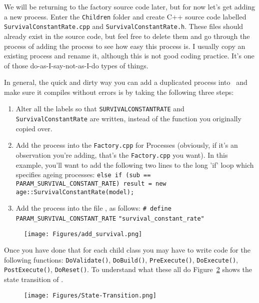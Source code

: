 We will be returning to the factory source code later, but for now let's get adding a new process. Enter the \texttt{Children} folder and create C++ source code labelled \texttt{SurvivalConstantRate.cpp} and \texttt{SurvivalConstantRate.h}. These files should already exist in the source code, but feel free to delete them and go through the process of adding the process to see how easy this process is. I usually copy an existing process and rename it, although this is not good coding practice. It's one of those do-as-I-say-not-as-I-do types of things.

In general, the quick and dirty way you can add a duplicated process into \CNAME\ and make sure it compiles without errors is by taking the following three steps:
\begin{enumerate}
	\item Alter all the labels so that \texttt{SURVIVALCONSTANTRATE} and \texttt{SurvivalConstantRate} are written, instead of the function you originally copied over.
	\item Add the process into the \texttt{Factory.cpp} for Processes (obviously, if it's an observation you're adding, that's the \texttt{Factory.cpp} you want). In this example, you'll want to add the following two lines to the long 'if' loop which specifies ageing processes:
	\texttt{else if (sub == PARAM\_SURVIVAL\_CONSTANT\_RATE)
		result = new age::SurvivalConstantRate(model);}
	\item Add the process into the file , as follows: \texttt{\# define PARAM\_SURVIVAL\_CONSTANT\_RATE} \texttt{"survival\_constant\_rate"}	
\end{enumerate}

\begin{figure}[!ht]
	\centering
	\texttt{[image: Figures/add\_survival.png]}
	\caption{}\label{fig:process2}
\end{figure}

Once you have done that for each child class you may have to write code for the following functions{\color{red}:} \texttt{DoValidate()}, \texttt{DoBuild()}, \texttt{PreExecute()}, \texttt{DoExecute()}, \texttt{PostExecute()}, \texttt{DoReset()}. To understand what these all do Figure~\ref{fig:flow} shows the state transition of \CNAME.
\raggedbottom
\begin{figure}[!ht]
	\centering
	\texttt{[image: Figures/State-Transition.png]}
	\caption{}\label{fig:flow}
\end{figure}

